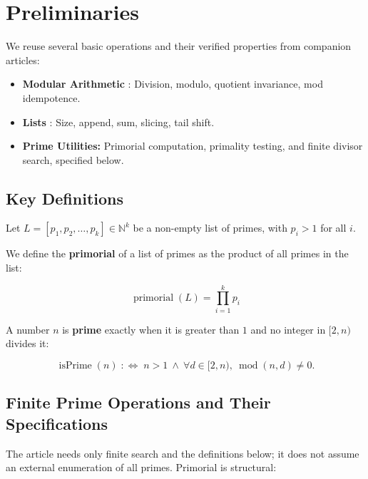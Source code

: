 \section{Preliminaries}
\label{sec:preliminaries}

We reuse several basic operations and their verified properties from
companion articles:

\begin{itemize}
  \item \textbf{Modular Arithmetic} \cite{mata2026modulo}: Division,
    modulo, quotient invariance, mod idempotence.
  \item \textbf{Lists} \cite{mata2026lists}: Size, append, sum, slicing,
    tail shift.
  \item \textbf{Prime Utilities:} Primorial computation, primality
    testing, and finite divisor search, specified below.
\end{itemize}

\subsection{Key Definitions}
\label{sec:key-definitions}

Let $L = [p_1, p_2, \dots, p_k] \in \mathbb{N}^k$ be a non-empty list of
primes, with $p_i > 1$ for all $i$.

We define the \textbf{primorial} of a list of primes as the product of all
primes in the list:

\begin{equation*}
\operatorname{primorial}(L) = \prod_{i=1}^{k} p_i
\end{equation*}

A number $n$ is \textbf{prime} exactly when it is greater than $1$ and no
integer in $[2,n)$ divides it:

\begin{equation*}
\operatorname{isPrime}(n) \;:\Longleftrightarrow\; n>1\ \land\
\forall d\in[2,n),\ \operatorname{mod}(n,d)\ne0.
\end{equation*}

\subsection{Finite Prime Operations and Their Specifications}
\label{sec:finite-prime-operations}

The article needs only finite search and the definitions below; it does
not assume an external enumeration of all primes. Primorial is structural:

